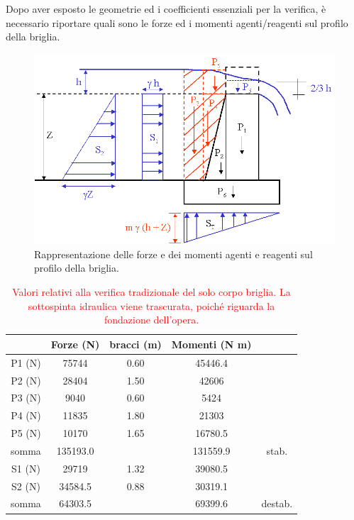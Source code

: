 Dopo aver esposto le geometrie ed i coefficienti essenziali per la verifica, è necessario riportare quali sono le forze ed i momenti agenti/reagenti sul profilo della briglia.
\begin{figure}[H]  \centering
    \includegraphics[scale=0.5]{immagini/forze_agenti_briglia.png}
    \caption{Rappresentazione delle forze e dei momenti agenti e reagenti sul profilo della briglia.}
    \label{forze_agenti_briglia}
\end{figure}

\begin{table}[H] \centering
    \caption{\textcolor{red}{Valori relativi alla verifica tradizionale del solo corpo briglia. La sottospinta idraulica viene trascurata, poiché riguarda la fondazione dell'opera.}}
    \begin{tabular}{ccccc}
    \toprule
           & Forze (N) & bracci (m) & Momenti (N m)    &         \\
    \midrule
    P1 (N) & 75744     & 0.60       & 45446.4          &         \\
    P2 (N) & 28404     & 1.50       & 42606            &         \\
    P3 (N) & 9040      & 0.60       & 5424             &         \\
    P4 (N) & 11835     & 1.80       & 21303            &         \\
    P5 (N) & 10170     & 1.65       & 16780.5          &         \\
    somma  & 135193.0  &            & 131559.9         & stab.   \\
    \midrule
    S1 (N) & 29719     & 1.32       & 39080.5        &         \\
    S2 (N) & 34584.5   & 0.88       & 30319.1 &         \\
    somma  & 64303.5   &            & 69399.6          & destab. \\
    \bottomrule
    \end{tabular}
    \end{table}

